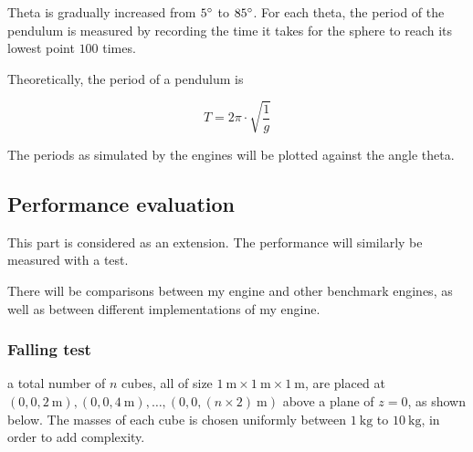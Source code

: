 \documentclass[12pt]{article}
\begin{document}
\begin{center}
  \end{center}

Theta is gradually increased from $5\degree$ to $85\degree$.
For each theta, 
the period of the pendulum is measured by recording the time it takes for the sphere to reach its lowest point $100$ times.

Theoretically, the period of a pendulum is

\begin{equation}
T = 2  \pi \cdot \sqrt{\frac{1}{g}}
\end{equation}

The periods as simulated by the engines will be plotted against the angle theta.

\subsection{Performance evaluation}

This part is considered as an extension. The performance will similarly be measured with a test.

There will be comparisons between my engine and other benchmark engines, as well as between different implementations of my engine.

\subsubsection{Falling test}

a total number of $n$ cubes, all of size $\SI{1}{\m} \times \SI{1}{\m} \times \SI{1}{\m}$, 
are placed at $(0, 0, \SI{2}{\m}), (0, 0, \SI{4}{\m}), \ldots, (0, 0, (n \times 2)\SI{}{\m})$ above a plane of $z = 0$, 
as shown below.
The masses of each cube is chosen uniformly between $\SI{1}{\kg}$ to $\SI{10}{\kg}$, in order to add complexity.
\end{document}
